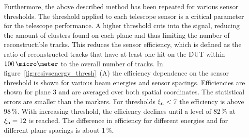 
Furthermore, the above described method has been repeated for various sensor thresholds.
The threshold applied to each telescope sensor is a critical parameter for the telescope performance.
A higher threshold cuts into the signal, reducing the amount of clusters found on each plane and thus limiting the number of reconstructible tracks.
This reduces the sensor efficiency, which is defined as the ratio of reconstructed tracks that have at least one hit on the DUT within $100\,\micro\meter$ to the overall number of tracks.
In figure~\ref{fig:resivsenergy_thresh}~(A) the efficiency dependence on the sensor threshold is shown for various beam energies and sensor spacings.
Efficiencies are shown for plane 3 and are averaged over both spatial coordinates. 
The statistical errors are smaller than the markers.
For thresholds $\xi_{\textrm{n}} < 7$ the efficiency is above $98\,\%$.
With increasing threshold, the efficiency declines until a level of $82\,\%$ at $\xi_{\textrm{n}} = 12$ is reached.
The difference in efficiency for different energies and for different plane spacings is about 1\,\%. %

